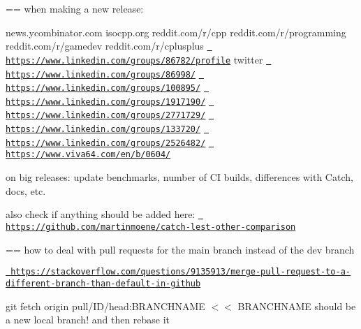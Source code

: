 == when making a new release\+:

news.\+ycombinator.\+com isocpp.\+org reddit.\+com/r/cpp reddit.\+com/r/programming reddit.\+com/r/gamedev reddit.\+com/r/cplusplus \href{https://www.linkedin.com/groups/86782/profile}{\texttt{ https\+://www.\+linkedin.\+com/groups/86782/profile}} twitter \href{https://www.linkedin.com/groups/86998/}{\texttt{ https\+://www.\+linkedin.\+com/groups/86998/}} \href{https://www.linkedin.com/groups/100895/}{\texttt{ https\+://www.\+linkedin.\+com/groups/100895/}} \href{https://www.linkedin.com/groups/1917190/}{\texttt{ https\+://www.\+linkedin.\+com/groups/1917190/}} \href{https://www.linkedin.com/groups/2771729/}{\texttt{ https\+://www.\+linkedin.\+com/groups/2771729/}} \href{https://www.linkedin.com/groups/133720/}{\texttt{ https\+://www.\+linkedin.\+com/groups/133720/}} \href{https://www.linkedin.com/groups/2526482/}{\texttt{ https\+://www.\+linkedin.\+com/groups/2526482/}} \href{https://www.viva64.com/en/b/0604/}{\texttt{ https\+://www.\+viva64.\+com/en/b/0604/}}

on big releases\+: update benchmarks, number of CI builds, differences with Catch, docs, etc.

also check if anything should be added here\+: \href{https://github.com/martinmoene/catch-lest-other-comparison}{\texttt{ https\+://github.\+com/martinmoene/catch-\/lest-\/other-\/comparison}}

== how to deal with pull requests for the main branch instead of the dev branch
\begin{DoxyItemize}
\item \href{https://stackoverflow.com/questions/9135913/merge-pull-request-to-a-different-branch-than-default-in-github}{\texttt{ https\+://stackoverflow.\+com/questions/9135913/merge-\/pull-\/request-\/to-\/a-\/different-\/branch-\/than-\/default-\/in-\/github}}
\item git fetch origin pull/\+ID/head\+:BRANCHNAME \texorpdfstring{$<$}{<}\texorpdfstring{$<$}{<} BRANCHNAME should be a new local branch! and then rebase it
\end{DoxyItemize}

